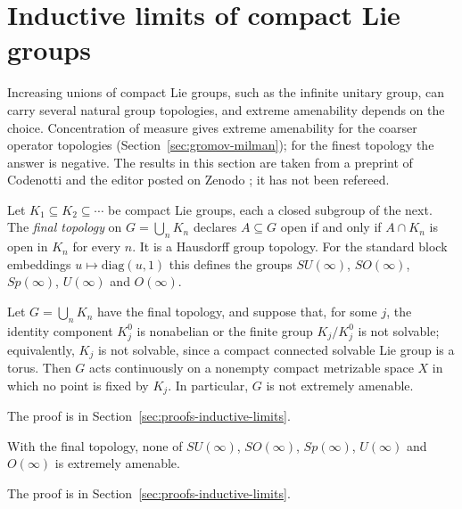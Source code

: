 \section{Inductive limits of compact Lie groups}\label{sec:inductive-limits}

Increasing unions of compact Lie groups, such as the infinite unitary group,
can carry several natural group topologies, and extreme amenability depends on
the choice. Concentration of measure gives extreme amenability for the
coarser operator topologies (Section~\ref{sec:gromov-milman}); for the finest
topology the answer is negative. The results in this section are taken from
a preprint of Codenotti and the editor posted on Zenodo
\cite{LupiniInductive2026}; it has not been refereed.

\begin{definition}\label{def:final-topology}
Let $K_1\subseteq K_2\subseteq\cdots$ be compact Lie groups, each a closed
subgroup of the next. The \emph{final topology} on $G=\bigcup_nK_n$ declares
$A\subseteq G$ open if and only if $A\cap K_n$ is open in $K_n$ for every $n$.
It is a Hausdorff group topology. For the standard block embeddings
$u\mapsto\mathrm{diag}(u,1)$ this defines the groups $SU(\infty)$,
$SO(\infty)$, $Sp(\infty)$, $U(\infty)$ and $O(\infty)$.
\end{definition}

\begin{theorem}\label{thm:lupini-inductive}
Let $G=\bigcup_nK_n$ have the final topology, and suppose that, for some $j$,
the identity component $K_j^0$ is nonabelian or the finite group $K_j/K_j^0$
is not solvable; equivalently, $K_j$ is not solvable, since a compact
connected solvable Lie group is a torus. Then $G$ acts continuously on a
nonempty compact metrizable space $X$ in which no point is fixed by $K_j$. In
particular, $G$ is not extremely amenable.
\end{theorem}

The proof is in Section~\ref{sec:proofs-inductive-limits}.

\begin{corollary}\label{cor:lupini-inductive}
With the final topology, none of $SU(\infty)$, $SO(\infty)$, $Sp(\infty)$,
$U(\infty)$ and $O(\infty)$ is extremely amenable.
\end{corollary}

The proof is in Section~\ref{sec:proofs-inductive-limits}.

